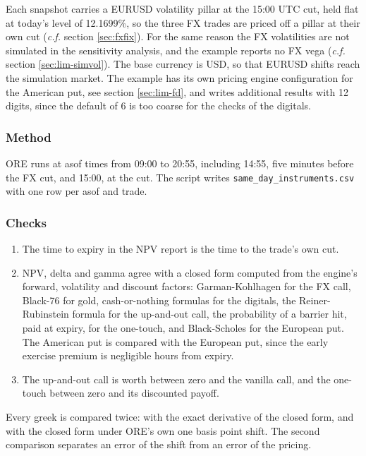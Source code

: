 \documentclass[12pt, a4paper]{article}
\begin{document}
Each snapshot carries a EURUSD volatility pillar at the 15:00 UTC cut, held flat at today's level of 12.1699\%, so the
three FX trades are priced off a pillar at their own cut (\textit{c.f.} section \ref{sec:fxfix}). For the same reason the FX
volatilities are not simulated in the sensitivity analysis, and the example reports no FX vega (\textit{c.f.} section
\ref{sec:lim-simvol}). The base currency is USD, so that EURUSD shifts reach the simulation market. The example has its own pricing engine
configuration for the American put, see section \ref{sec:lim-fd}, and writes additional results with 12 digits, since
the default of 6 is too coarse for the checks of the digitals.

\subsubsection*{Method}

ORE runs at asof times from 09:00 to 20:55, including 14:55, five minutes before the FX cut, and 15:00, at the cut. The
script writes \texttt{same\_day\_instruments.csv} with one row per asof and trade.

\subsubsection*{Checks}

\begin{enumerate}
\item The time to expiry in the NPV report is the time to the trade's own cut.
\item NPV, delta and gamma agree with a closed form computed from the engine's forward, volatility and discount
  factors: Garman-Kohlhagen for the FX call, Black-76 for gold, cash-or-nothing formulas for the digitals, the
  Reiner-Rubinstein formula for the up-and-out call, the probability of a barrier hit, paid at expiry, for the
  one-touch, and Black-Scholes for the European put. The American put is compared with the European put, since the
  early exercise premium is negligible hours from expiry.
\item The up-and-out call is worth between zero and the vanilla call, and the one-touch between zero and its
  discounted payoff.
\end{enumerate}

Every greek is compared twice: with the exact derivative of the closed form, and with the closed form under ORE's own
one basis point shift. The second comparison separates an error of the shift from an error of the pricing.
\end{document}
